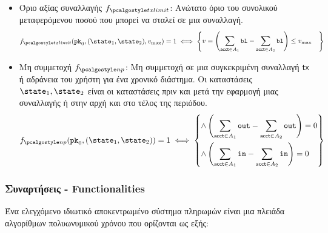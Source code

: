\begin{itemize}
    \item Όριο αξίας συναλλαγής $f_{\txnlimit}$: Ανώτατο όριο του συνολικού μεταφερόμενου ποσού που μπορεί να σταλεί σε μια συναλλαγή.
    \begin{align*}
        f_{\txnlimit}(\inpk, (\snap_1, \snap_2), v_{\max}) = 1 \iff  
        \left\{ \begin{aligned} 
        & v = \left(\sum_{\acct \in A_1}\varbl - \sum_{\acct \in A_2}\varbl \right) \leq v_{\max} 
        \end{aligned} \right\}
    \end{align*}

    \item Μη συμμετοχή $f_{\nonpart}$: Μη συμμετοχή σε μια συγκεκριμένη συναλλαγή $\textup{\textsf{tx}}$ ή αδράνεια του χρήστη για ένα χρονικό διάστημα. Οι καταστάσεις $\snap_1, \snap_2$ είναι οι καταστάσεις πριν και μετά την εφαρμογή μιας συναλλαγής ή στην αρχή και στο τέλος της περιόδου.
        \begin{align*}
            f_{\nonpart}(\inpk, (\snap_1, \snap_2)) = 1 \iff  
            \left\{ 
                \begin{aligned} 
                    \land & \left(\sum_{\acct \in A_{1}}\varout - \sum_{\acct \in A_{2}}\varout \right) = 0 \\
                    \land &\left(\sum_{\acct \in A_{1}}\varin - \sum_{\acct \in A_{2}}\varin \right) = 0
                \end{aligned} 
            \right\}
        \end{align*}

\end{itemize}

\subsubsection{Συναρτήσεις - Functionalities}
Ένα ελεγχόμενο ιδιωτικό αποκεντρωμένο σύστημα πληρωμών είναι μια πλειάδα αλγορίθμων πολυωνυμικού χρόνου που ορίζονται ως εξής:

